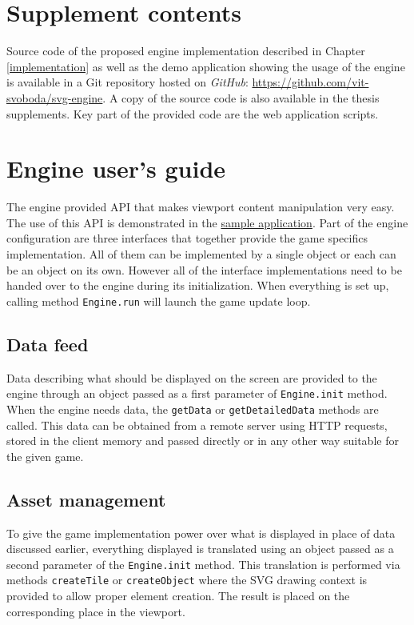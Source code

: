 \documentclass[11pt,oneside, final]{fithesis2}
\begin{document}
\appendix
\chapter{Supplement contents}

Source code of the proposed engine implementation described in Chapter \ref{implementation} as well as the demo application showing the usage of the engine is available in a Git repository hosted on \emph{GitHub}: \href{https://github.com/vit-svoboda/svg-engine}{https://github.com/vit-svoboda/svg-engine}. A copy of the source code is also available in the thesis supplements. Key part of the provided code are the web application scripts.

\chapter{Engine user's guide}
The engine provided API that makes viewport content manipulation very easy. The use of this API is demonstrated in the \href{https://github.com/vit-svoboda/svg-engine/tree/master/src/main/webapp/Scripts/game}{sample application}. Part of the engine configuration are three interfaces that together provide the game specifics implementation. All of them can be implemented by a single object or each can be an object on its own. However all of the interface implementations need to be handed over to the engine during its initialization. When everything is set up, calling method \texttt{Engine.run} will launch the game update loop. 

\section{Data feed}
Data describing what should be displayed on the screen are provided to the engine through an object passed as a first parameter of \texttt{Engine.init} method. When the engine needs data, the \texttt{getData} or \texttt{getDetailedData} methods are called. This data can be obtained from a remote server using HTTP requests, stored in the client memory and passed directly or in any other way suitable for the given game.

\section{Asset management}
To give the game implementation power over what is displayed in place of data discussed earlier, everything displayed is translated using an object passed as a second parameter of the \texttt{Engine.init} method. This translation is performed via methods \texttt{createTile} or \texttt{createObject} where the SVG drawing context is provided to allow proper element creation. The result is placed on the corresponding place in the viewport.
\end{document}
